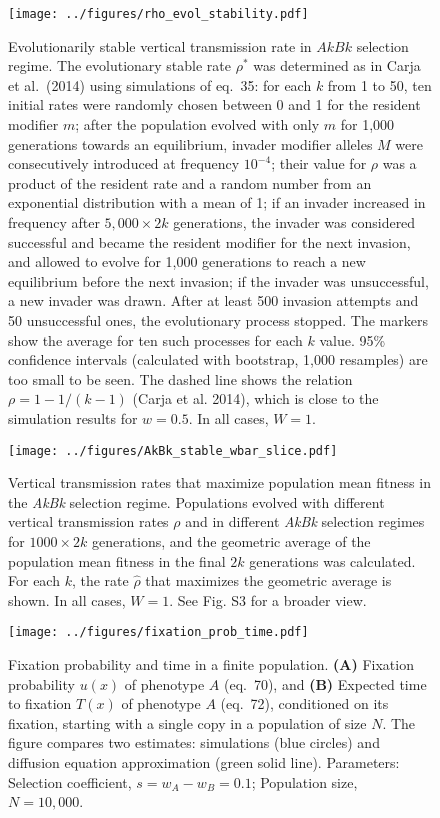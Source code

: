 \documentclass[]{article}
\begin{document}
\begin{figure}
\centering
\texttt{[image: ../figures/rho\_evol\_stability.pdf]}
\caption{Evolutionarily stable vertical transmission rate in $AkBk$ selection regime. 
The evolutionary stable rate $\rho^*$ was determined as in Carja et al.\ (2014) using simulations of eq.\ 35: for each $k$ from 1 to 50, ten initial rates were randomly chosen between 0 and 1 for the resident modifier $m$; after the population evolved with only $m$ for 1,000 generations towards an equilibrium, invader modifier alleles $M$ were consecutively introduced at frequency $10^{-4}$; their value for $\rho$ was a product of the resident rate and a random number from an exponential distribution with a mean of 1; if an invader increased in frequency after $5,000 \times 2k$ generations, the invader was considered successful and became the resident modifier for the next invasion, and allowed to evolve for 1,000 generations to reach a new equilibrium before the next invasion; if the invader was unsuccessful, a new invader was drawn. After at least 500 invasion attempts and 50 unsuccessful ones, the evolutionary process stopped. The markers show the average for ten such processes for each $k$ value. 95\% confidence intervals (calculated with bootstrap, 1,000 resamples) are too small to be seen. The dashed line shows the relation $\rho=1-1/(k-1)$ (Carja et al. 2014), which is close to the simulation results for \(w=0.5\).
In all cases, $W=1$.}\label{fig:rho_evol_stability}
\end{figure}

\begin{figure}
\centering
\texttt{[image: ../figures/AkBk\_stable\_wbar\_slice.pdf]}
\caption{Vertical transmission rates that maximize population mean fitness in the \emph{AkBk} selection regime.
Populations evolved with different vertical transmission rates \(\rho\) and in different \emph{AkBk} selection regimes for \(1000 \times 2k\) generations, and the geometric average of the population mean fitness in the final \(2k\) generations was calculated.
For each \(k\), the rate \(\hat{\rho}\) that maximizes the geometric average is shown.
In all cases, $W=1$. See Fig. S3 for a broader view.} \label{AkBk_stable_wbar_slice}
\end{figure}
 
\begin{figure}
\centering
\texttt{[image: ../figures/fixation\_prob\_time.pdf]}
\caption{Fixation probability and time in a finite population.
\textbf{(A)} Fixation probability \(u(x)\) of phenotype \(A\) (eq.\ 70), and \textbf{(B)}
Expected time to fixation \(T(x)\) of phenotype \(A\) (eq.\ 72), conditioned on its
fixation, starting with a single copy in a population of size \(N\). The
figure compares two estimates: simulations (blue circles) and diffusion
equation approximation (green solid line). Parameters: Selection coefficient, \(s=w_A-w_B=0.1\);
Population size, \(N=10,000\).}\label{fixation_prob_time}
\end{figure}
\end{document}
